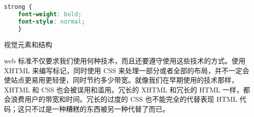 \begin{compactenum}
\begin{lstlisting}[language=CSS]
strong {
	font-weight: bold;
	font-style: normal;
	}
\end{lstlisting}

\item 视觉元素和结构

web 标准不仅要求我们使用何种技术，而且还要遵守使用这些技术的方式。使用 XHTML 来编写标记，同时使用 CSS 来处理一部分或者全部的布局，并不一定会使站点更易用更轻便，同时节约多少带宽。就像我们在早期使用的技术那样，XHTML 和 CSS 也会被误用和滥用。冗长的 XHTML 和冗长的 HTML 一样，都会浪费用户的带宽和时间。冗长的过度的 CSS 也不能完全的代替表现 HTML 代码；这只不过是一种糟糕的东西被另一种代替了而已。

\end{compactenum}



































